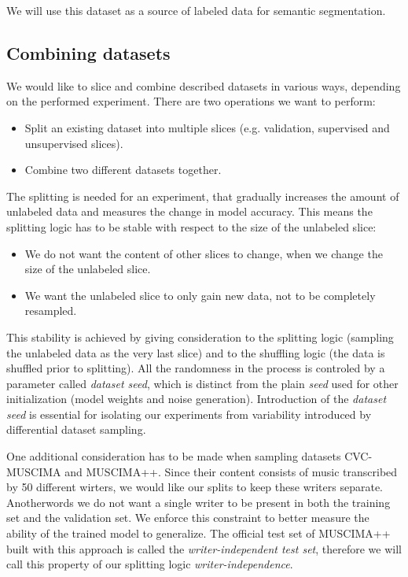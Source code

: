 We will use this dataset as a source of labeled data for semantic segmentation.


\subsection{Combining datasets}

We would like to slice and combine described datasets in various ways, depending on the performed experiment. There are two operations we want to perform:

\begin{itemize}
    \item Split an existing dataset into multiple slices (e.g. validation, supervised and unsupervised slices).
    \item Combine two different datasets together.
\end{itemize}

The splitting is needed for an experiment, that gradually increases the amount of unlabeled data and measures the change in model accuracy. This means the splitting logic has to be stable with respect to the size of the unlabeled slice:

\begin{itemize}
    \item We do not want the content of other slices to change, when we change the size of the unlabeled slice.
    \item We want the unlabeled slice to only gain new data, not to be completely resampled.
\end{itemize}

This stability is achieved by giving consideration to the splitting logic (sampling the unlabeled data as the very last slice) and to the shuffling logic (the data is shuffled prior to splitting). All the randomness in the process is controled by a parameter called \emph{dataset seed}, which is distinct from the plain \emph{seed} used for other initialization (model weights and noise generation). Introduction of the \emph{dataset seed} is essential for isolating our experiments from variability introduced by differential dataset sampling.

One additional consideration has to be made when sampling datasets CVC-MUSCIMA and MUSCIMA++. Since their content consists of music transcribed by 50 different wirters, we would like our splits to keep these writers separate. Anotherwords we do not want a single writer to be present in both the training set and the validation set. We enforce this constraint to better measure the ability of the trained model to generalize. The official test set of MUSCIMA++ built with this approach is called the \emph{writer-independent test set}, therefore we will call this property of our splitting logic \emph{writer-independence}.

